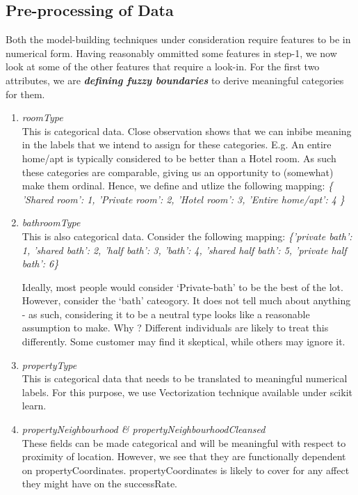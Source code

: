 \documentclass[conference]{IEEEtran}
\begin{document}
{     \subsection{\textbf{Pre-processing of Data}}
	Both the model-building techniques under consideration require features to be in numerical form. Having reasonably ommitted some features in step-1, we now look at some of the other features that require a look-in. For the first two attributes, we are \textit{\textbf{defining fuzzy boundaries}} to derive meaningful categories for them.
	\begin{enumerate}
           	\item \textit{roomType}\\
			This is categorical data. Close observation shows that we can inbibe meaning in the labels that we intend to assign for these categories. E.g. An entire home/apt is typically considered to be better than a Hotel room. As such these categories are comparable, giving us an opportunity to (somewhat) make them ordinal. Hence, we define and utlize the following mapping:
		 	 \textit{ \{ 'Shared room': 1,  'Private room': 2, 'Hotel room': 3, 'Entire home/apt': 4 \} }
		
		\item \textit{bathroomType}\\
			This is also categorical data. Consider the following mapping:
			\textit{ \{'private bath': 1, 'shared bath': 2, 'half bath': 3, 'bath': 4, 'shared half bath': 5,  'private half bath': 6\} }
			
			Ideally, most people would consider ‘Private-bath’ to be the best of the lot. However, consider the ‘bath’ cateogory. It does not tell much about anything - as such, considering it to be a neutral type looks like a reasonable assumption to make. Why ? Different individuals are likely to treat this differently. Some customer may find it skeptical, while others may ignore it.

		\item \textit{propertyType}\\
			This is categorical data that needs to be translated to meaningful numerical labels. For this purpose, we use Vectorization technique available under scikit learn. 

		\item \textit{\small propertyNeighbourhood  \&  propertyNeighbourhoodCleansed}\\
			These fields can be made categorical and will be meaningful with respect to proximity of location. However, we see that they are functionally dependent on propertyCoordinates. propertyCoordinates is likely to cover for any affect they might have on the successRate.
	\end{enumerate}


}
\end{document}
